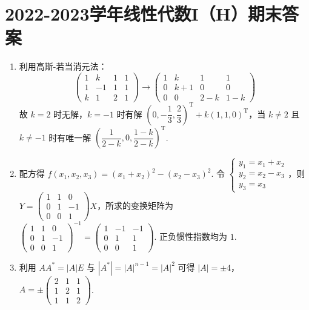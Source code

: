 \section{2022-2023学年线性代数I（H）期末答案}

\begin{enumerate}
    \item 利用高斯-若当消元法：
    \[
    \begin{pmatrix}
        1 & k & 1 & 1 \\
        1 & -1 & 1 & 1 \\
        k & 1 & 2 & 1
    \end{pmatrix} \to \begin{pmatrix}
        1 & k & 1 & 1 \\
        0 & k+1 & 0 & 0 \\
        0 & 0 & 2-k & 1-k
    \end{pmatrix}
    \]
    故 $k=2$ 时无解，$k=-1$ 时有解 $(0,-\dfrac{1}{3},\dfrac{2}{3})^\mathrm{T}+k(1,1,0)^\mathrm{T}$，当 $k\neq 2$ 且 $k\neq -1$ 时有唯一解 $(\dfrac{1}{2-k},0,\dfrac{1-k}{2-k})^\mathrm{T}$.

    \item 配方得 $f(x_1,x_2,x_3)=(x_1+x_2)^2-(x_2-x_3)^2$. 令 $\begin{cases}
        y_1=x_1+x_2 \\ y_2=x_2 - x_3 \\ y_3=x_3
    \end{cases}$，则 $Y=\begin{pmatrix}
        1 & 1 & 0 \\
        0 & 1 & -1 \\
        0 & 0 & 1
    \end{pmatrix}X$，所求的变换矩阵为 $\begin{pmatrix}
        1 & 1 & 0 \\
        0 & 1 & -1 \\
        0 & 0 & 1
    \end{pmatrix}^{-1}=\begin{pmatrix}
        1 & -1 & -1 \\
        0 & 1 & 1 \\
        0 & 0 & 1
    \end{pmatrix}$. 正负惯性指数均为 $1$.

    \item 利用 $AA^*=|A|E$ 与 $|A^*|=|A|^{n-1}=|A|^2$ 可得 $|A|=\pm 4$，$A = \pm\begin{pmatrix}
        2 & 1 & 1 \\
        1 & 2 & 1 \\
        1 & 1 & 2
    \end{pmatrix}$.


\end{enumerate}
